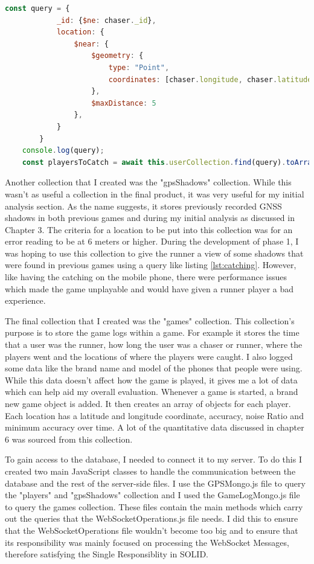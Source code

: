 \documentclass{l4proj}
\begin{document}
\begin{lstlisting}[language=javascript, float, caption={The Geospatial query used to implement the catching mechanic. The \$ne key is the way to make a not equals query.}, label=lst:catching]
    const query = {
            _id: {$ne: chaser._id},
            location: {
                $near: {
                    $geometry: {
                        type: "Point",
                        coordinates: [chaser.longitude, chaser.latitude]
                    },
                    $maxDistance: 5
                },
            }
        }
    console.log(query);
    const playersToCatch = await this.userCollection.find(query).toArray();
\end{lstlisting}

Another collection that I created was the "gpsShadows" collection. While this wasn't as useful a collection in the final product, 
it was very useful for my initial analysis section. As the name suggests, it stores previously recorded GNSS shadows in both previous
games and during my initial analysis as discussed in Chapter 3. The criteria for a location to be put into this collection was for
an error reading to be at 6 meters or higher. During the development of phase 1, I was hoping to use this collection to give the runner
a view of some shadows that were found in previous games using a query like listing \ref{lst:catching}. However, like having the catching
on the mobile phone, there were performance issues which made the game unplayable and would have given a runner player a bad experience.

The final collection that I created was the "games" collection. This collection's purpose is to store the game logs within a game. For example
it stores the time that a user was the runner, how long the user was a chaser or runner, where the players went and the locations of where the
players were caught. I also logged some data like the brand name and model of the phones that people were using. While this data doesn't affect
how the game is played, it gives me a lot of data which can help aid my overall evaluation. Whenever a game is started, a brand new game object
is added. It then creates an array of objects for each player. Each location has a latitude and longitude coordinate, accuracy, noise Ratio and minimum
accuracy over time. A lot of the quantitative data discussed in chapter 6 was sourced from this collection.

To gain access to the database, I needed to connect it to my server. To do this I created two main JavaScript classes to handle the
communication between the database and the rest of the server-side files. I use the GPSMongo.js file to query the "players" and "gpsShadows"
collection and I used the GameLogMongo.js file to query the games collection. These files contain the main methods which carry out the queries
that the WebSocketOperations.js file needs. I did this to ensure that the WebSocketOperations file wouldn't become too big and to ensure that
its responsibility was mainly focused on processing the WebSocket Messages, therefore satisfying the Single Responsiblity in SOLID.
\end{document}
